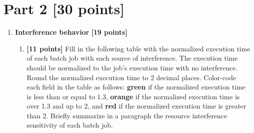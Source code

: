 \vspace{-10mm}
\section*{Part 2 [30 points]}

\begin{enumerate}
 
    \item \textbf{Interference behavior} \textbf{[19 points]}

    \begin{enumerate}


        \item \textbf{[11 points]} Fill in the following table with the normalized execution time of each batch job with each source of interference. The execution time should be normalized to the job’s execution time with no interference. Round the normalized execution time to 2 decimal places. Color-code each field in the table as follows: {\color{Green}\textbf{green}} if the normalized execution time is less than or equal to 1.3, {\color{YellowOrange}\textbf{orange}} if the normalized execution time is over 1.3 and up to 2, and {\color{Red}\textbf{red}} if the normalized execution time is greater than 2. Briefly summarize in a paragraph the resource interference sensitivity of each batch job. 


\end{enumerate}
\end{enumerate}
